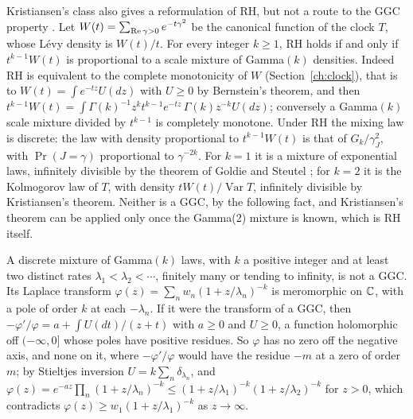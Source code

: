 \begin{remark}\label{rem:maxexp:kolmogorov}
Kristiansen's class also gives a reformulation of RH, but not a route to the GGC property \cite{PolsonRXi26}. Let $W(t)=\sum_{\operatorname{Re}\gamma>0}e^{-t\gamma^2}$ be the canonical function of the clock $T$, whose L\'evy density is $W(t)/t$. For every integer $k\ge1$, RH holds if and only if $t^{k-1}W(t)$ is proportional to a scale mixture of Gamma$(k)$ densities. Indeed RH is equivalent to the complete monotonicity of $W$ (Section~\ref{ch:clock}), that is to $W(t)=\int e^{-tz}U(dz)$ with $U\ge0$ by Bernstein's theorem, and then $t^{k-1}W(t)=\int\Gamma(k)^{-1}z^kt^{k-1}e^{-tz}\,\Gamma(k)z^{-k}U(dz)$; conversely a Gamma$(k)$ scale mixture divided by $t^{k-1}$ is completely monotone. Under RH the mixing law is discrete: the law with density proportional to $t^{k-1}W(t)$ is that of $G_k/\gamma_J^2$, with $\Pr(J=\gamma)$ proportional to $\gamma^{-2k}$. For $k=1$ it is a mixture of exponential laws, infinitely divisible by the theorem of Goldie and Steutel \cite{Goldie67,Steutel67}; for $k=2$ it is the Kolmogorov law of $T$, with density $tW(t)/\operatorname{Var}T$, infinitely divisible by Kristiansen's theorem. Neither is a GGC, by the following fact, and Kristiansen's theorem can be applied only once the Gamma(2) mixture is known, which is RH itself.

\begin{resultpar}\label{res:maxexp:nonggc}A discrete mixture of Gamma$(k)$ laws, with $k$ a positive integer and at least two distinct rates $\lambda_1<\lambda_2<\cdots$, finitely many or tending to infinity, is not a GGC. Its Laplace transform $\varphi(z)=\sum_nw_n(1+z/\lambda_n)^{-k}$ is meromorphic on $\mathbb{C}$, with a pole of order $k$ at each $-\lambda_n$. If it were the transform of a GGC, then $-\varphi'/\varphi=a+\int U(dt)/(z+t)$ with $a\ge0$ and $U\ge0$, a function holomorphic off $(-\infty,0]$ whose poles have positive residues. So $\varphi$ has no zero off the negative axis, and none on it, where $-\varphi'/\varphi$ would have the residue $-m$ at a zero of order $m$; by Stieltjes inversion $U=k\sum_n\delta_{\lambda_n}$, and $\varphi(z)=e^{-az}\prod_n(1+z/\lambda_n)^{-k}\le(1+z/\lambda_1)^{-k}(1+z/\lambda_2)^{-k}$ for $z>0$, which contradicts $\varphi(z)\ge w_1(1+z/\lambda_1)^{-k}$ as $z\to\infty$.\end{resultpar}


\end{remark}
